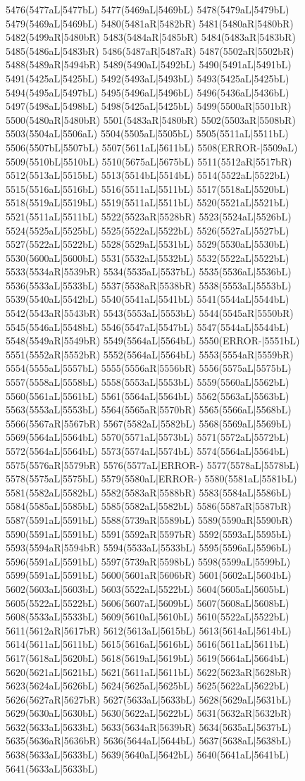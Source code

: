 5476(5477aL|5477bL) 5477(5469aL|5469bL) 5478(5479aL|5479bL) 5479(5469aL|5469bL) 5480(5481aR|5482bR) 5481(5480aR|5480bR) 5482(5499aR|5480bR) 5483(5484aR|5485bR) 5484(5483aR|5483bR) 5485(5486aL|5483bR) 5486(5487aR|5487aR) 5487(5502aR|5502bR) 5488(5489aR|5494bR) 5489(5490aL|5492bL) 5490(5491aL|5491bL) 5491(5425aL|5425bL) 5492(5493aL|5493bL) 5493(5425aL|5425bL) 5494(5495aL|5497bL) 5495(5496aL|5496bL) 5496(5436aL|5436bL) 5497(5498aL|5498bL) 5498(5425aL|5425bL) 5499(5500aR|5501bR) 5500(5480aR|5480bR) 5501(5483aR|5480bR) 5502(5503aR|5508bR) 5503(5504aL|5506aL) 5504(5505aL|5505bL) 5505(5511aL|5511bL) 5506(5507bL|5507bL) 5507(5611aL|5611bL) 5508(ERROR-|5509aL) 5509(5510bL|5510bL) 5510(5675aL|5675bL) 5511(5512aR|5517bR) 5512(5513aL|5515bL) 5513(5514bL|5514bL) 5514(5522aL|5522bL) 5515(5516aL|5516bL) 5516(5511aL|5511bL) 5517(5518aL|5520bL) 5518(5519aL|5519bL) 5519(5511aL|5511bL) 5520(5521aL|5521bL) 5521(5511aL|5511bL) 5522(5523aR|5528bR) 5523(5524aL|5526bL) 5524(5525aL|5525bL) 5525(5522aL|5522bL) 5526(5527aL|5527bL) 5527(5522aL|5522bL) 5528(5529aL|5531bL) 5529(5530aL|5530bL) 5530(5600aL|5600bL) 5531(5532aL|5532bL) 5532(5522aL|5522bL) 5533(5534aR|5539bR) 5534(5535aL|5537bL) 5535(5536aL|5536bL) 5536(5533aL|5533bL) 5537(5538aR|5538bR) 5538(5553aL|5553bL) 5539(5540aL|5542bL) 5540(5541aL|5541bL) 5541(5544aL|5544bL) 5542(5543aR|5543bR) 5543(5553aL|5553bL) 5544(5545aR|5550bR) 5545(5546aL|5548bL) 5546(5547aL|5547bL) 5547(5544aL|5544bL) 5548(5549aR|5549bR) 5549(5564aL|5564bL) 5550(ERROR-|5551bL) 5551(5552aR|5552bR) 5552(5564aL|5564bL) 5553(5554aR|5559bR) 5554(5555aL|5557bL) 5555(5556aR|5556bR) 5556(5575aL|5575bL) 5557(5558aL|5558bL) 5558(5553aL|5553bL) 5559(5560aL|5562bL) 5560(5561aL|5561bL) 5561(5564aL|5564bL) 5562(5563aL|5563bL) 5563(5553aL|5553bL) 5564(5565aR|5570bR) 5565(5566aL|5568bL) 5566(5567aR|5567bR) 5567(5582aL|5582bL) 5568(5569aL|5569bL) 5569(5564aL|5564bL) 5570(5571aL|5573bL) 5571(5572aL|5572bL) 5572(5564aL|5564bL) 5573(5574aL|5574bL) 5574(5564aL|5564bL) 5575(5576aR|5579bR) 5576(5577aL|ERROR-) 5577(5578aL|5578bL) 5578(5575aL|5575bL) 5579(5580aL|ERROR-) 5580(5581aL|5581bL) 5581(5582aL|5582bL) 5582(5583aR|5588bR) 5583(5584aL|5586bL) 5584(5585aL|5585bL) 5585(5582aL|5582bL) 5586(5587aR|5587bR) 5587(5591aL|5591bL) 5588(5739aR|5589bL) 5589(5590aR|5590bR) 5590(5591aL|5591bL) 5591(5592aR|5597bR) 5592(5593aL|5595bL) 5593(5594aR|5594bR) 5594(5533aL|5533bL) 5595(5596aL|5596bL) 5596(5591aL|5591bL) 5597(5739aR|5598bL) 5598(5599aL|5599bL) 5599(5591aL|5591bL) 5600(5601aR|5606bR) 5601(5602aL|5604bL) 5602(5603aL|5603bL) 5603(5522aL|5522bL) 5604(5605aL|5605bL) 5605(5522aL|5522bL) 5606(5607aL|5609bL) 5607(5608aL|5608bL) 5608(5533aL|5533bL) 5609(5610aL|5610bL) 5610(5522aL|5522bL) 5611(5612aR|5617bR) 5612(5613aL|5615bL) 5613(5614aL|5614bL) 5614(5611aL|5611bL) 5615(5616aL|5616bL) 5616(5611aL|5611bL) 5617(5618aL|5620bL) 5618(5619aL|5619bL) 5619(5664aL|5664bL) 5620(5621aL|5621bL) 5621(5611aL|5611bL) 5622(5623aR|5628bR) 5623(5624aL|5626bL) 5624(5625aL|5625bL) 5625(5622aL|5622bL) 5626(5627aR|5627bR) 5627(5633aL|5633bL) 5628(5629aL|5631bL) 5629(5630aL|5630bL) 5630(5622aL|5622bL) 5631(5632aR|5632bR) 5632(5633aL|5633bL) 5633(5634aR|5639bR) 5634(5635aL|5637bL) 5635(5636aR|5636bR) 5636(5644aL|5644bL) 5637(5638aL|5638bL) 5638(5633aL|5633bL) 5639(5640aL|5642bL) 5640(5641aL|5641bL) 5641(5633aL|5633bL) 